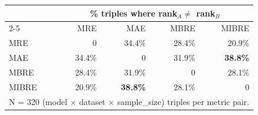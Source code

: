 \begin{tabular}{lrrrr}
\toprule
 & \multicolumn{4}{c}{\% triples where rank$_A \neq$ rank$_B$} \\
\cmidrule{2-5}
 & MRE & MAE & MBRE & MIBRE \\
\midrule
MRE & 0 & 34.4\% & 28.4\% & 20.9\% \\
MAE & 34.4\% & 0 & 31.9\% & \textbf{38.8\%} \\
MBRE & 28.4\% & 31.9\% & 0 & 28.1\% \\
MIBRE & 20.9\% & \textbf{38.8\%} & 28.1\% & 0 \\
\bottomrule
\multicolumn{5}{l}{\footnotesize N = 320 (model $\times$ dataset $\times$ sample\_size) triples per metric pair.}
\end{tabular}
